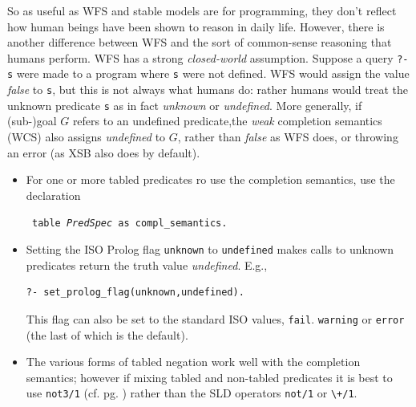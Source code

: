 So as useful as WFS and stable models are for programming, they don't
reflect how human beings have been shown to reason in daily life.
However, there is another difference between WFS and the sort of
common-sense reasoning that humans perform.  WFS has a strong {\em
  closed-world} assumption.  Suppose a query {\tt ?- s} were made to a
program where {\tt s} were not defined.  WFS would assign the value
{\em false} to {\tt s}, but this is not always what humans do: rather
humans would treat the unknown predicate {\tt s} as in fact {\em
  unknown} or {\em undefined}.  More generally, if (sub-)goal $G$
refers to an undefined predicate,the {\em weak} completion semantics
(WCS) also assigns {\em undefined} to $G$, rather than {\em false} as
WFS does, or throwing an error (as XSB also does by default).

\begin{itemize}
\item For one or more tabled predicates ro use the completion semantics,
use the declaration

\noindent
{\tt \mif{} table {\em PredSpec} as compl\_semantics.}

\item Setting the ISO Prolog flag {\tt unknown} to {\tt undefined}
  makes calls to unknown predicates return the truth value {\em
    undefined}.  E.g., 
\begin{verbatim}
?- set_prolog_flag(unknown,undefined).
\end{verbatim}
This flag can also be set to the standard ISO values,
  {\tt fail}. {\tt warning} or {\tt error} (the last of which is the
    default).

\item The various forms of tabled negation work well with the
  completion semantics; however if mixing tabled and non-tabled
  predicates it is best to use {\tt not3/1} (cf. pg. \pageref{not3})
  rather than the SLD operators {\tt not/1} or \verb|\+/1|.
\end{itemize}



